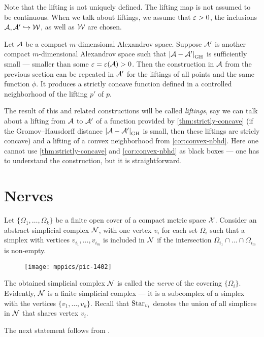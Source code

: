 Note that the lifting is not uniquely defined.
The lifting map is not assumed to be continuous.
When we talk about liftings, we assume that $\varepsilon>0$, the inclusions $\mathcal{A},\mathcal{A}'\hookrightarrow\mathcal{W}$,
as well as $\mathcal{W}$ are chosen.

Let $\mathcal{A}$ be  a compact $m$-dimensional Alexandrov space.
Suppose $\mathcal{A}'$ is another compact $m$-dimensional Alexandrov space such that $|{\mathcal{A}}-{\mathcal{A}'}|_{\operatorname{\rm GH}\nolimits}^{{}}$ is sufficiently small --- smaller than some $\varepsilon=\varepsilon(\mathcal{A})>0$.
Then the construction in $\mathcal{A}$ from the previous section  
can be repeated in $\mathcal{A}'$ for the liftings of all points and the same function $\phi$.
It produces a strictly concave function defined in a controlled neighborhood of the lifting $p'$ of $p$.

The result of this and related constructions will be called \emph{liftings},
say we can talk about a lifting from $\mathcal{A}$ to $\mathcal{A}'$ of a function provided by \ref{thm:strictly-concave} (if the Gromov--Hausdorff distance $|{\mathcal{A}}-{\mathcal{A}'}|_{\operatorname{\rm GH}\nolimits}^{{}}$ is small, then these liftings are stricly concave)
and a lifting of a convex neighborhood from \ref{cor:convex-nbhd}.
Here one cannot use \ref{thm:strictly-concave} and \ref{cor:convex-nbhd} as black boxes --- one has to understand the construction, but it is straightforward.

\section{Nerves}

Let $\{\Omega_1,\dots,\Omega_k\}$ be a finite open cover of a compact metric space $\mathcal{X}$.
Consider an abstract simplicial complex $\mathcal{N}$, with one vertex $v_i$ for each set $\Omega_i$ such that a simplex with vertices $v_{i_1},\dots, v_{i_m}$ is included in $\mathcal{N}$ if 
the intersection $\Omega_{i_1}\cap\dots\cap \Omega_{i_m}$ is non-empty.
\begin{figure}[ht!]
\vskip-0mm
\centering
\texttt{[image: mppics/pic-1402]}
\end{figure}
The obtained simplicial complex $\mathcal{N}$ is called the \emph{nerve} of the covering $\{\Omega_i\}$.
Evidently, $\mathcal{N}$ is a finite simplicial complex ---
it is a subcomplex of a simplex with the vertices $\{v_1,\dots,v_k\}$.
Recall that $\mathop{\rm Star}\nolimits_{v_i}$ denotes the union of all simplices in $\mathcal{N}$ that shares vertex $v_i$.

The next statement follows from \cite[4G.3]{hatcher}.


